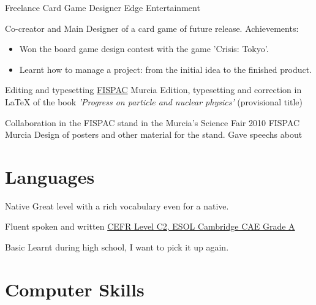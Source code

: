 \documentclass[11pt,a4paper,roman]{moderncv}
\begin{document}
{Freelance Card Game Designer}
{Edge Entertainment}{}{}
{Co-creator and Main Designer of a card game of future release.\newline{}
Achievements:
\begin{itemize}
\item Won the board game design contest with the game 'Crisis: Tokyo'.
\item Learnt how to manage a project: from the initial idea to the finished product.
\end{itemize}}

{Editing and typesetting}
{\href{http://www.um.es/fispac/}{FISPAC}}
{Murcia}
{}
{Edition, typesetting and correction in \LaTeX{} of the book \textit{'Progress on particle and nuclear physics'} (provisional title)\newline{}}

{Collaboration in the FISPAC stand in the Murcia's Science Fair 2010}
{FISPAC}
{Murcia}
{}
{Design of posters and other material for the stand. Gave speechs about\newline{}}



\section{Languages}
{Native}
{Great level with a rich vocabulary even for a native.}

{Fluent spoken and written}
{\href{https://dl.dropbox.com/u/87894135/StatementOfResult.pdf}
{CEFR Level C2, ESOL Cambridge CAE Grade A}}

{Basic}
{Learnt during high school, I want to pick it up again.}


\section{Computer Skills}
\end{document}
